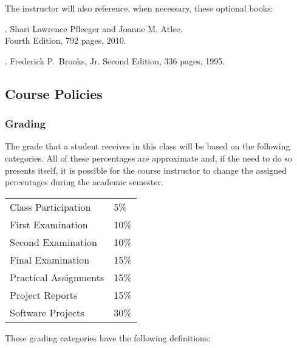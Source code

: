 \documentclass[11pt]{article}
\begin{document}
\noindent
The instructor will also reference, when necessary, these optional books:
%
\vspace*{.25em}

. Shari Lawrence
Pfleeger and Joanne M. Atlee.\\ Fourth Edition, 792 pages, 2010.
%
\vspace*{.25em}

. Frederick P.\ Brooks, Jr.
Second Edition, 336 pages, 1995.

\vspace*{-.25em}
\subsection*{Course Policies}

\subsubsection*{Grading}

The grade that a student receives in this class will be based on the following
categories. All of these percentages are approximate and, if the need to do so
presents itself, it is possible for the course instructor to change the assigned
percentages during the academic semester.

\renewcommand{\arraystretch}{1.2}

\begin{center}
  \begin{tabular}{ll}
    Class Participation        & 5\%  \\
    First Examination          & 10\% \\
    Second Examination         & 10\% \\
    Final Examination          & 15\% \\
    Practical Assignments      & 15\% \\
    Project Reports            & 15\% \\
    Software Projects          & 30\%
  \end{tabular}
\end{center}

\noindent
These grading categories have the following definitions:

\vspace*{-.05in}
\end{document}
